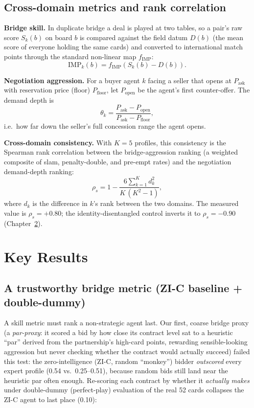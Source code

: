 \documentclass[11pt, a4paper, oneside, openany]{report}
\begin{document}
\section{Cross-domain metrics and rank correlation}
\textbf{Bridge skill.} In duplicate bridge a deal is played at two tables, so a
pair's raw score $S_k(b)$ on board $b$ is compared against the field datum
$D(b)$ (the mean score of everyone holding the same cards) and converted to
international match points through the standard non-linear map $f_{\text{IMP}}$:
\begin{equation}
\mathrm{IMP}_k(b) = f_{\text{IMP}}\!\left(S_k(b) - D(b)\right).
\end{equation}

\textbf{Negotiation aggression.} For a buyer agent $k$ facing a seller that
opens at $P_{\text{ask}}$ with reservation price (floor) $P_{\text{floor}}$,
let $P_{\text{open}}$ be the agent's first counter-offer. The demand depth is
\begin{equation}
\theta_k = \frac{P_{\text{ask}} - P_{\text{open}}}{P_{\text{ask}} - P_{\text{floor}}},
\end{equation}
i.e.\ how far down the seller's full concession range the agent opens.

\textbf{Cross-domain consistency.} With $K=5$ profiles, this consistency
is the Spearman rank correlation between the bridge-aggression
ranking (a weighted composite of slam, penalty-double, and pre-empt rates) and
the negotiation demand-depth ranking:
\begin{equation}
\rho_s = 1 - \frac{6\sum_{k=1}^{K} d_k^2}{K\,(K^2-1)},
\end{equation}
where $d_k$ is the difference in $k$'s rank between the two domains. The
measured value is $\rho_s = +0.80$; the identity-disentangled control inverts
it to $\rho_s = -0.90$ (Chapter~\ref{ch:keyresults}).

\chapter{Key Results}
\label{ch:keyresults}

\section{A trustworthy bridge metric (ZI-C baseline + double-dummy)}
A skill metric must rank a non-strategic agent last. Our first, coarse bridge
proxy (a \emph{par-proxy}: it scored a bid by how close its contract level sat
to a heuristic ``par'' derived from the partnership's high-card points,
rewarding sensible-looking aggression but never checking whether the contract
would actually succeed) failed this test: the zero-intelligence (ZI-C, random
``monkey'') bidder \emph{outscored} every expert profile (0.54 vs.\
0.25--0.51), because random bids still land near the heuristic par often
enough. Re-scoring each contract by whether it \emph{actually makes} under
double-dummy (perfect-play) evaluation of the real 52 cards collapses the ZI-C
agent to last place (0.10):
\end{document}

